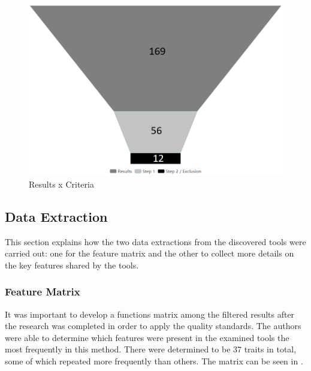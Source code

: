 

\begin{figure}[!htb]
  \caption{Results x Criteria}\label{fig:gl-results-criteria}
  \begin{center}
    \includegraphics[width=12cm]{img/4-results.png}
  \end{center}
\end{figure}

\subsection{Data Extraction}\label{sec:gl-data-extraction}

This section explains how the two data extractions from the discovered tools were carried out: one for the feature matrix and the other to collect more details on the key features shared by the tools.

\subsubsection{Feature Matrix}\label{sec:gl-feature-matrix}

It was important to develop a functions matrix among the filtered results after the research was completed in order to apply the quality standards. The authors were able to determine which features were present in the examined tools the most frequently in this method. There were determined to be 37 traits in total, some of which repeated more frequently than others. The matrix can be seen in .

